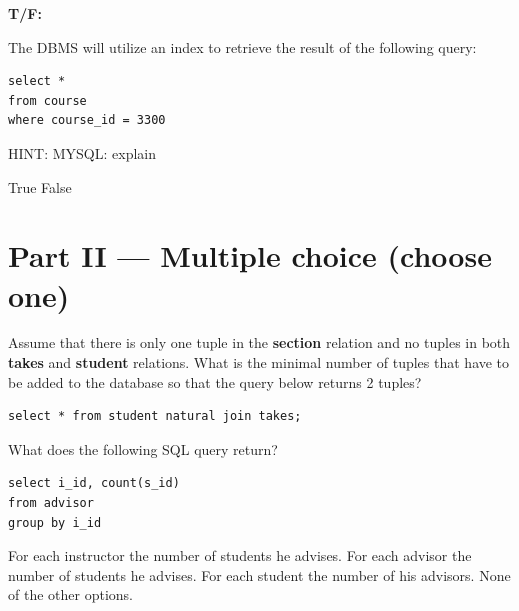 \documentclass[12pt]{exam}
\makeatletter
\newcommand{\TFQ@choices}{} %
\newenvironment{tfqverb}[2]{%
  \def\TFQ@choices{#2}%
  \question[#1]\textbf{T/F:}%
}{%
  \ifprintanswers
    \par\begin{oneparchoices}\TFQ@choices\end{oneparchoices}
  \fi
}
\makeatother
\begin{document}
\begin{questions}
\begin{tfqverb}{3}{\choice True \CorrectChoice False}
The DBMS will utilize an index to retrieve the result of the following query:\par
\begin{verbatim}
select * 
from course
where course_id = 3300
  \end{verbatim}
HINT: MYSQL: explain\par\vspace{0.5em}
  \end{tfqverb}
\section*{Part II — Multiple choice (choose one)}

\question[3] Assume that there is only one tuple in the \textbf{section} relation and no tuples in both \textbf{takes} and \textbf{student} relations. What is the minimal number of tuples that have to be added to the database so that the query below returns 2 tuples?

\begin{verbatim}
select * from student natural join takes;
\end{verbatim}

\begin{choices}
\end{choices}


\question[3]
What does the following SQL query return?\par\vspace{0.5em}
\begin{verbatim}
select i_id, count(s_id) 
from advisor 
group by i_id
\end{verbatim}
\begin{choices} 
    \choice For each instructor the number of students he advises.
    \choice For each advisor the number of students he advises.
    \choice For each student the number of his advisors.
    \CorrectChoice None of the other options.
\end{choices}


\end{questions}
\end{document}
